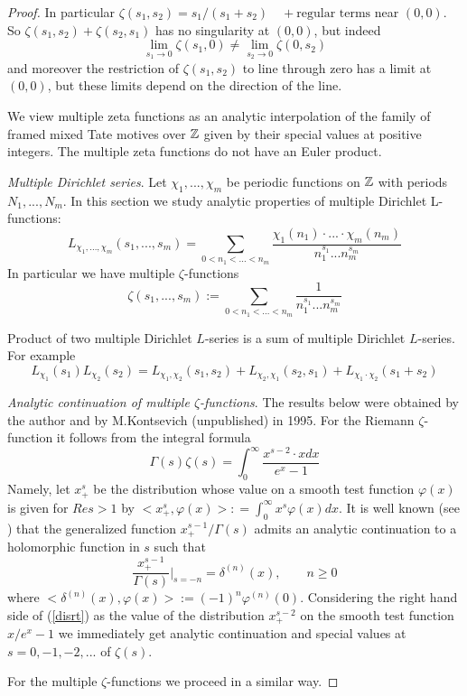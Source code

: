 \documentclass[10pt]{article}
\begin{document}
\begin{proof}
In particular $\zeta(s_1,s_2) =  
s_1/(s_1+s_2) \quad + \mbox{regular terms}$ near $(0,0)$. So 
$\zeta(s_1,s_2) + \zeta(s_2,s_1)$ has no singularity at $(0,0)$,
but indeed
$$
\lim_{s_1 \to 0} \zeta(s_1,0) \not = \lim_{s_2 \to
  0}\zeta(0,s_2) 
$$
and moreover the restriction of   $\zeta(s_1,s_2)$  to line through zero
has a limit at $(0,0)$, but these limits depend on the direction of
the line. 

We view multiple zeta functions as an analytic interpolation of the family of framed 
mixed Tate 
motives over ${\mathbb Z}$ given by their special values at positive integers. 
The multiple zeta functions do not have an Euler product. 


{\it Multiple Dirichlet series}. 
Let $\chi_1,...,\chi_m$  be periodic functions on ${\mathbb Z}$ with periods  $N_1,...,N_m$.
In this section we study analytic properties of multiple Dirichlet L-functions:
$$
L_{\chi_1,...,\chi_m}(s_1,...,s_m) = 
\sum_{0< n_1 < ... < n_m}\frac{\chi_1(n_1)\cdot...\cdot\chi_m(n_m)}{n_1^{s_1} ...  n_m^{s_m}}
$$
In particular we have multiple $\zeta$-functions
$$
\zeta(s_1,...,s_m):= \sum_{0< n_1 < ... < n_m}\frac{1}{n_1^{s_1} ...  n_m^{s_m}}
$$

 Product of two multiple Dirichlet $L$-series  is a  sum
of  multiple Dirichlet $L$-series. For example  
$$
L_{\chi_1}(s_1 )L_{\chi_2}( s_2 ) = L_{\chi_1,\chi_2}( s_1, s_2) + L_{\chi_2,\chi_1}(s_ 2,s_1) + L_{\chi_1\cdot\chi_2}( s_1 + s_2)
$$


{\it Analytic continuation of  multiple $\zeta$-functions}. The results below were 
obtained by the author and by M.Kontsevich (unpublished) in 1995. 
    For the  Riemann $\zeta$-function it follows  from the integral formula  
\begin{equation}  \label{disrt}
\Gamma(s) \zeta(s) = \int_0^{\infty} \frac{x^{s-2}\cdot xdx}{e^{x}-1}
\end{equation} 
Namely,  let $x_+^{s}$ be the distribution whose value on a smooth test function $\varphi(x)$ is given for $Re s >1$ by    $<x_+^{s},\varphi(x)>: = \int_0^{\infty}x^{s}\varphi(x) dx$.   
It is well known (see \cite{GS}) that
the generalized function
$x_+^{s-1} /\Gamma(s)$
admits an analytic continuation to a holomorphic function in $s$ such that     
$$%
\frac{x_+^{s-1}}{\Gamma(s)}\vert_{s=-n} = \delta^{(n)}(x), \qquad n \geq 0
$$%
where $<\delta^{(n)}(x), \varphi(x)>:= (-1)^n\varphi^{(n)}(0)$.
Considering the right hand side of  (\ref{disrt}) as the value of the distribution
$x_+^{s-2}$ on the smooth test function $x/e^{x}-1$ we immediately get analytic continuation and special values at  $s = 0,-1,-2, ...$ of $\zeta(s)$.

For the multiple $\zeta$-functions  we  proceed in a similar way.


\end{proof}
\end{document}

